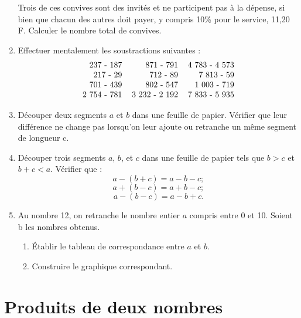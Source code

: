\documentclass[12 pt]{report}
\theoremstyle{plain}
\newcounter{n}
\begin{document}
\begin{enumerate}
 Trois de ces convives sont des invités et ne participent pas à la dépense,
 si bien que chacun des autres doit payer, y compris 10\% pour le service,
 11,20 F. Calculer le nombre total de convives.
 \item Effectuer mentalement les soustractions suivantes : 
 \[\begin{tabular}{rrr}
 237 - 187 & 871 - 791 & 4~783 - 4~573 \\
 217 - 29 & 712 - 89 & 7~813 - 59 \\
 701 - 439 & 802 - 547 & 1~003 - 719 \\ 
 2~754 - 781 & 3~232 - 2~192 & 7~833 - 5~935
\end{tabular}\]
 
 \item Découper deux segments $a$ et $b$ dans une feuille de papier.
 Vérifier que leur différence ne change pas lorsqu'on leur ajoute ou retranche un même segment de longueur c. 
 
 \item Découper trois segments $a$, $b$, et $c$ dans une feuille de papier tels que $b> c$ et $ b + c < a$. Vérifier que : 
 \[ a - (b+c) = a - b - c;\]
 \[ a + (b - c) = a + b - c ;\]
 \[ a - (b - c) = a - b + c.\] 
 
 \item Au nombre 12, on retranche le nombre entier $a$ compris entre 0 et 10. Soient b les nombres obtenus. 
 \begin{enumerate}
 \item Établir le tableau de correspondance entre $a$ et $b$. 
 \item Construire le graphique correspondant.
 \end{enumerate}
 
 \end{enumerate}
 
 \chapter{Produits de deux nombres}
 
\end{document}
